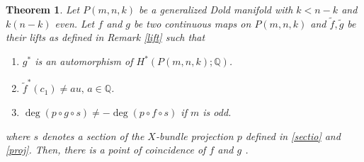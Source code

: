 \documentclass{amsart}
\newtheorem{theorem}{Theorem}[section]
\begin{document}
\begin{theorem}\label{coincidence thm}
	Let $P(m,n,k)$ be a generalized Dold manifold with $k<n-k$ and $k(n-k)$ even. Let $f$ and $g$ be two continuous maps on $P(m,n,k)$ and $\tilde f, \tilde g$ be their lifts as defined in  Remark \ref{lift} such %
that
	\begin{enumerate}	
		\item $g^*$ is an automorphism of $H^*(P(m,n,k);\mathbb Q)$. 
		\item $\tilde{f}^*(c_1) \neq au,\, a \in \mathbb{Q}$.
		\item $\deg(p\circ g \circ s)\neq -\deg (p\circ f\circ s)$ %
if $m$ %
is odd.
	\end{enumerate}
	where %
$s$ denotes a section of the $X$-bundle projection $p$ defined in \eqref{sectio} and \eqref{proj}.	Then, there is a point of coincidence of $f$ and  $g$%
.
\end{theorem}
\end{document}
